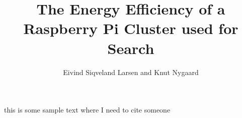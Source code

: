 \documentclass[a4paper, 12pt]{article}
\title{The Energy Efficiency of a Raspberry Pi Cluster used for Search}
\author{Eivind Siqveland Larsen and Knut Nygaard}
\begin{document}
\maketitle



\tableofcontents


this is some sample text where I need to cite someone \cite{BEOwulf}











\end{document}
